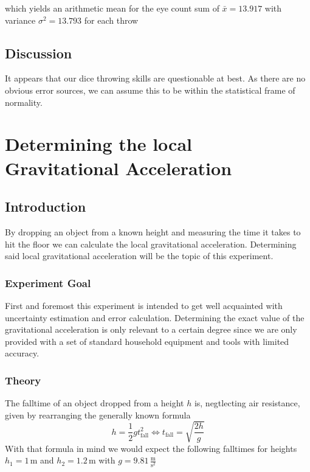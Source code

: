 \documentclass{scrreprt}
\newcommand{\unit}[1]{\ensuremath{\, \mathrm{#1}}}
\begin{document}
which yields an arithmetic mean for the eye count sum of $\bar{x} = 13.917$ with variance $\sigma^2 = 13.793$ for each throw\\

\section{Discussion}
It appears that our dice throwing skills are questionable at best. As there are no obvious error sources, we can assume this to be within the statistical frame of normality.

\chapter[Gravitational Acceleration]{Determining the local Gravitational Acceleration}
\section{Introduction}
By dropping an object from a known height and measuring the time it takes to hit the floor we can calculate the local gravitational acceleration. Determining said local gravitational acceleration will be the topic of this experiment.

\subsection{Experiment Goal}
First and foremost this experiment is intended to get well acquainted with uncertainty estimation and error calculation. Determining the exact value of the gravitational acceleration is only relevant to a certain degree since we are only provided with a set of standard household equipment and tools with limited accuracy.

\subsection{Theory}
The falltime of an object dropped from a height $h$ is, negtlecting air resistance, given by rearranging the generally known formula 
\begin{equation}h = \frac{1}{2} g t_{\text{fall}}^{2} \Longleftrightarrow  t_{\text{fall}} = \sqrt{\frac{2h}{g}}
\end{equation}
With that formula in mind we would expect the following falltimes for heights $h_1 = 1\unit{m}$ and $h_2 = 1.2\unit{m}$ with $g = 9.81\unit{\frac{m}{s^{2}}}$
\end{document}
